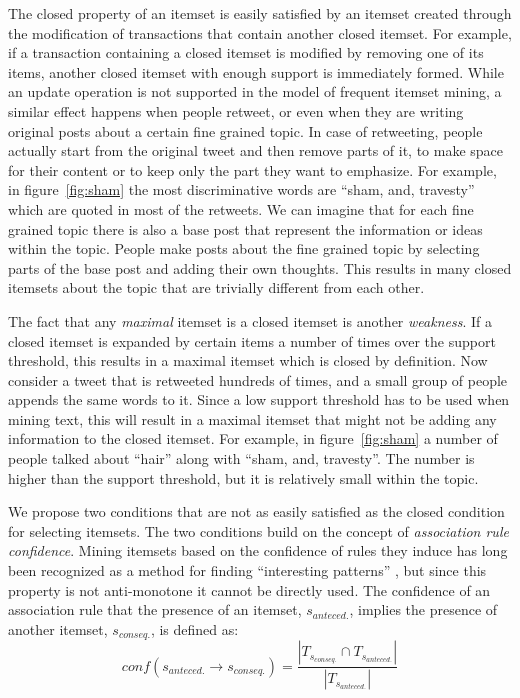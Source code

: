 \documentclass{sig-alternate}
\begin{document}
The closed property of an itemset is easily satisfied by an itemset
created through the modification of 
transactions that contain another closed itemset.
For example, if a transaction containing a closed itemset
is modified by removing one of its items,
another closed itemset with enough support is immediately formed.
While an update operation is not supported in the model of frequent itemset mining, 
a similar effect happens when people retweet, 
or even when they are writing original posts about 
a certain fine grained topic.
In case of retweeting, people actually start from the original tweet and 
then remove parts of it,
to make space for their content
or to keep only the part they want to emphasize. 
For example, in figure~\ref{fig:sham}  the most discriminative words are ``sham, and, travesty''
which are quoted 
in most of the retweets.
We can imagine that for each fine grained topic there is also a base post
that represent the information or ideas within the topic. 
People make posts about the fine grained topic 
by selecting parts of the base post
and adding their own thoughts.
This results in many closed itemsets 
about the topic that
are trivially different from each other.

The fact that any \emph{maximal} itemset is a closed itemset
is another \emph{weakness}. %
If a closed itemset is expanded by certain items a number of times
over the support threshold, this results in a maximal itemset
which is closed by definition.
Now consider a tweet that is retweeted hundreds of times, 
and a small group of people appends the same words to it.
Since  a low support threshold has to be used when mining text,
this will result in a maximal itemset that
might not be adding any information to the closed itemset.
For example, in figure~\ref{fig:sham} a number of people
talked about ``hair'' along with ``sham, and, travesty''. 
The number is higher than the support threshold,
but it is relatively small within the topic.

We propose two conditions that are not as easily satisfied as the closed
condition for selecting itemsets.
The two conditions build on the concept of \emph{association rule confidence}.
Mining itemsets based on the confidence of rules they induce has long been
recognized as a method for finding
``interesting patterns'' \cite{cohen2001finding},
but since this property is not anti-monotone 
it cannot be directly used.
The confidence of an association rule that the presence of an itemset,
$s_{anteced.}$, implies the presence of another itemset, $s_{conseq.}$, is  defined as:
\begin{equation}\label{eq:conf}conf(s_{anteced.} \rightarrow s_{conseq.}) = \frac{|T_{s_{conseq.}} \cap T_{s_{anteced.}}|}{|T_{s_{anteced.}}|}\end{equation}
\end{document}
